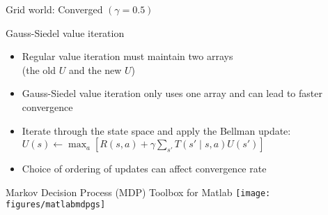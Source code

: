 \documentclass[handout]{dmu}
\begin{document}
\begin{frame}{Grid world: Converged $(\gamma = 0.5)$}
\begin{center}

\end{center}
\end{frame}

\begin{frame}{Gauss-Siedel value iteration}
\begin{itemize}
\item<1-> Regular value iteration must maintain two arrays \\(the old $U$ and the new $U$)
\item <2-> \alert<2>{Gauss-Siedel value iteration} only uses one array and can lead to faster convergence
\item <3-> Iterate through the state space and apply the Bellman update: $U(s) \leftarrow \max_a [R(s, a) + \gamma \sum_{s'} T(s' \mid s, a) U(s')]$
\item <4-> Choice of ordering of updates can affect convergence rate
\end{itemize}
\end{frame}

\begin{frame}{Markov Decision Process (MDP) Toolbox for Matlab}
\texttt{[image: figures/matlabmdpgs]}
\end{frame}

\clearfoot
\newcommand\utilr{\text{\textcolor{red}{r}}}
\newcommand\utilb{\text{\textcolor{blue}{b}}}
\end{document}
